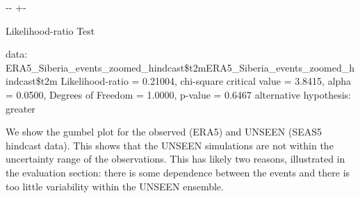 \documentclass[letterpaper,10pt,english]{sphinxmanual}
\newlength\nbsphinxcodecellspacing
\begin{document}
{
\begin{sphinxVerbatim}[commandchars=\\\{\}]
\llap{\color{nbsphinxin}[84]:\,\hspace{\fboxrule}\hspace{\fboxsep}}    
                      
    
                      
 
\end{sphinxVerbatim}
}

{

\kern-\sphinxverbatimsmallskipamount\kern-\baselineskip
\kern+\FrameHeightAdjust\kern-\fboxrule
\vspace{\nbsphinxcodecellspacing}

\begin{sphinxVerbatim}[commandchars=\\\{\}]

        Likelihood-ratio Test

data:  ERA5\_Siberia\_events\_zoomed\_hindcast\$t2mERA5\_Siberia\_events\_zoomed\_hindcast\$t2m
Likelihood-ratio = 0.21004, chi-square critical value = 3.8415, alpha =
0.0500, Degrees of Freedom = 1.0000, p-value = 0.6467
alternative hypothesis: greater

\end{sphinxVerbatim}
}

We show the gumbel plot for the observed (ERA5) and UNSEEN (SEAS5 hindcast data). This shows that the UNSEEN simulations are not within the uncertainty range of the observations. This has likely two reasons, illustrated in the evaluation section: there is some dependence between the events and there is too little variability within the UNSEEN ensemble.
\end{document}
